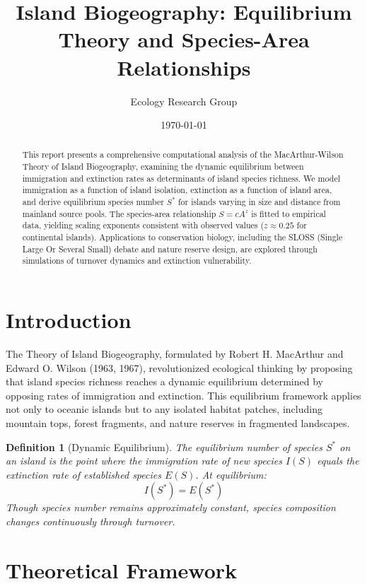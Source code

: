 \documentclass[a4paper, 11pt]{article}
\title{Island Biogeography: Equilibrium Theory and Species-Area Relationships}
\author{Ecology Research Group}
\date{\today}
\newtheorem{definition}{Definition}[section]
\begin{document}
\maketitle

\begin{abstract}
This report presents a comprehensive computational analysis of the MacArthur-Wilson Theory of
Island Biogeography, examining the dynamic equilibrium between immigration and extinction rates
as determinants of island species richness. We model immigration as a function of island isolation,
extinction as a function of island area, and derive equilibrium species number $S^*$ for islands
varying in size and distance from mainland source pools. The species-area relationship $S = cA^z$
is fitted to empirical data, yielding scaling exponents consistent with observed values ($z \approx 0.25$
for continental islands). Applications to conservation biology, including the SLOSS (Single Large
Or Several Small) debate and nature reserve design, are explored through simulations of turnover
dynamics and extinction vulnerability.
\end{abstract}

\section{Introduction}

The Theory of Island Biogeography, formulated by Robert H. MacArthur and Edward O. Wilson (1963, 1967),
revolutionized ecological thinking by proposing that island species richness reaches a dynamic equilibrium
determined by opposing rates of immigration and extinction. This equilibrium framework applies not only to
oceanic islands but to any isolated habitat patches, including mountain tops, forest fragments, and nature
reserves in fragmented landscapes.

\begin{definition}[Dynamic Equilibrium]
The equilibrium number of species $S^*$ on an island is the point where the immigration rate of new species
$I(S)$ equals the extinction rate of established species $E(S)$. At equilibrium:
\begin{equation}
I(S^*) = E(S^*)
\end{equation}
Though species number remains approximately constant, species composition changes continuously through
turnover.
\end{definition}

\section{Theoretical Framework}
\end{document}

